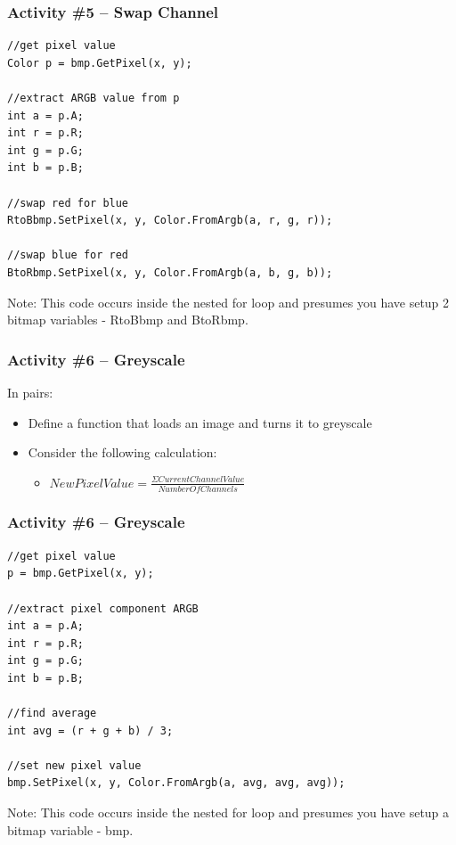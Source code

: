 \begin{frame}[fragile]
	\frametitle{Activity \#5 -- Swap Channel}
	
\begin{lstlisting}
//get pixel value
Color p = bmp.GetPixel(x, y);

//extract ARGB value from p
int a = p.A;
int r = p.R;
int g = p.G;
int b = p.B;

//swap red for blue
RtoBbmp.SetPixel(x, y, Color.FromArgb(a, r, g, r));

//swap blue for red
BtoRbmp.SetPixel(x, y, Color.FromArgb(a, b, g, b));
\end{lstlisting}

Note: This code occurs inside the nested for loop and presumes you have setup 2 bitmap variables - RtoBbmp and BtoRbmp.

\end{frame}

\begin{frame}
	\frametitle{Activity \#6 -- Greyscale}
	
	In pairs:
	
	\vspace{2em}
	
	\begin{itemize}
		\item Define a function that loads an image and turns it to greyscale
		\item Consider the following calculation:
		\begin{itemize}
			\item $New Pixel Value = \frac{\Sigma Current Channel Value}{Number Of Channels}$
		\end{itemize}
	\end{itemize}
\end{frame}

\begin{frame}[fragile]
	\frametitle{Activity \#6 -- Greyscale}
	
\begin{lstlisting}
//get pixel value
p = bmp.GetPixel(x, y);

//extract pixel component ARGB
int a = p.A;
int r = p.R;
int g = p.G;
int b = p.B;

//find average
int avg = (r + g + b) / 3;

//set new pixel value
bmp.SetPixel(x, y, Color.FromArgb(a, avg, avg, avg));
\end{lstlisting}

Note: This code occurs inside the nested for loop and presumes you have setup a bitmap variable - bmp.

\end{frame}

